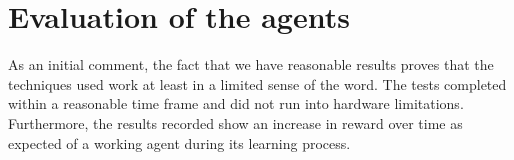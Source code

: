 \section{Evaluation of the agents}
\label{sec:eval_of_agents}
As an initial comment, the fact that we have reasonable results proves that the techniques used work at least in a limited sense of the word. The tests completed within a reasonable time frame and did not run into hardware limitations. Furthermore, the results recorded show an increase in reward over time as expected of a working agent during its learning process. 






